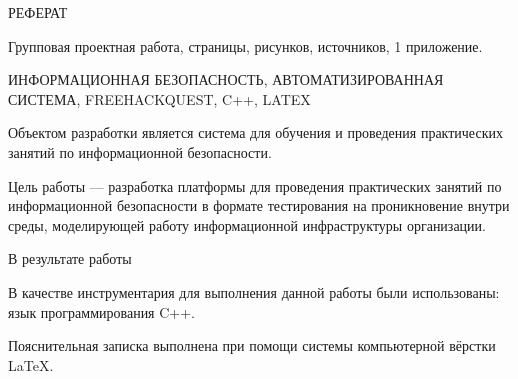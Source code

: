 \begin{center}
РЕФЕРАТ
\end{center}

\vspace{\baselineskip}

Групповая проектная работа,  страницы,  рисунков,  источников, 1 приложение.\par 

ИНФОРМАЦИОННАЯ БЕЗОПАСНОСТЬ, АВТОМАТИЗИРОВАННАЯ СИСТЕМА, FREEHACKQUEST, C++, LATEX\par 

Объектом разработки является система для обучения и проведения практических занятий по информационной безопасности.\par 

Цель работы — разработка платформы для проведения практических занятий по информационной безопасности в формате тестирования на проникновение внутри среды, моделирующей работу информационной инфраструктуры организации.\par

В результате работы \par

В качестве инструментария для выполнения данной работы были использованы: язык программирования C++.\par

Пояснительная записка выполнена при помощи системы компьютерной вёрстки \LaTeX.

\clearpage
